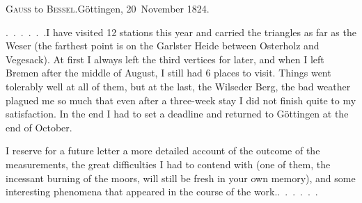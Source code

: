 \begin{center}
\textsc{Gauss} to \textsc{Bessel}.\quad Göttingen, 20~November 1824.
\end{center}

\par\noindent\hspace*{\parindent}.\ .\ .\ .\ .\ .\quad I have visited 12 stations this year and carried the triangles as far as the Weser (the farthest point is on the Garlster Heide between Osterholz and Vegesack).
At first I always left the third vertices for later, and when I left Bremen after the middle of August, I still had 6 places to visit.
Things went tolerably well at all of them, but at the last, the Wilseder Berg, the bad weather plagued me so much that even after a three-week stay I did not finish quite to my satisfaction. In the end I had to set a deadline and returned to Göttingen at the end of October.

\par\noindent\hspace*{\parindent}I reserve for a future letter a more detailed account of the outcome of the measurements, the great difficulties I had to contend with (one of them, the incessant burning of the moors, will still be fresh in your own memory), and some interesting phenomena that appeared in the course of the work.\quad\mbox{.\ .\ .\ .\ .\ .}

